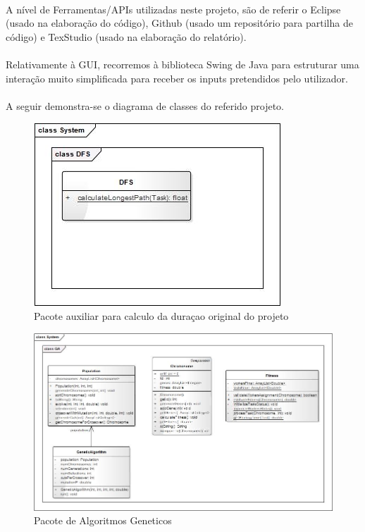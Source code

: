 \documentclass[a4paper]{article}
\begin{document}
\paragraph{} 
A nível de Ferramentas/APIs utilizadas neste projeto, são de referir o Eclipse (usado na elaboração do código), Github (usado um repositório para partilha de código) e TexStudio (usado na elaboração do relatório).
\paragraph{}
Relativamente à GUI, recorremos à biblioteca Swing de Java para estruturar uma interação muito simplificada para receber os inputs pretendidos pelo utilizador.
\paragraph{} 
A seguir demonstra-se o diagrama de classes do referido projeto.
\begin{figure}[!ht]
	\centering
	\includegraphics[scale=0.4]{uml1.png}
	\caption{Pacote auxiliar para calculo da duraçao original do projeto}
\end{figure}
\begin{figure}
	\centering
	\includegraphics[scale=0.4]{uml2.png}
	\caption{Pacote de Algoritmos Geneticos}
\end{figure}
\end{document}

